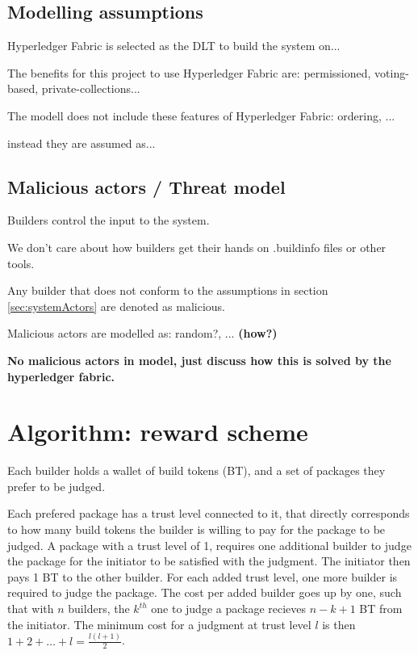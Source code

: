 \documentclass[english, biblatex, digitaloutput]{kththesis}
\begin{document}
\subsection{Modelling assumptions}
\label{sec:modellingAssumptions}

Hyperledger Fabric is selected as the DLT to build the system on...

The benefits for this project to use Hyperledger Fabric are: permissioned, voting-based, private-collections...

The modell does not include these features of Hyperledger Fabric: ordering, ...

instead they are assumed as...

\subsection{Malicious actors / Threat model}
\label{sec:maliciousActors}

Builders control the input to the system.

We don't care about how builders get their hands on .buildinfo files or other tools.

Any builder that does not conform to the assumptions in section \ref{sec:systemActors} are denoted as malicious.

Malicious actors are modelled as: random?, ... \textbf{(how?)}

\textbf{No malicious actors in model, just discuss how this is solved by the hyperledger fabric.}


\section{Algorithm: reward scheme}
Each builder holds a wallet of build tokens (BT), and a set of packages they prefer to be judged.

Each prefered package has a trust level connected to it, that directly corresponds to how many build tokens the builder is willing to pay for the package to be judged. A package with a trust level of 1, requires one additional builder to judge the package for the initiator to be satisfied with the judgment. The initiator then pays 1 BT to the other builder. For each added trust level, one more builder is required to judge the package. The cost per added builder goes up by one, such that with $n$ builders, the $k^{th}$ one to judge a package recieves $n - k + 1$ BT from the initiator. The minimum cost for a judgment at trust level $l$ is then $1 + 2 + \dotsc + l = \frac{l(l+1)}{2}$.
\end{document}
